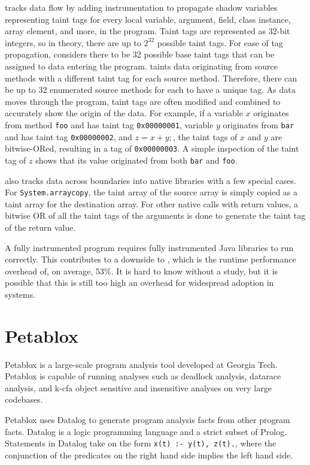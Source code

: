 \phosphor{} tracks data flow by adding instrumentation to propagate
shadow variables representing taint tags for every local variable,
argument, field, class instance, array element, and more, in the
program. Taint tags are represented as 32-bit integers, so in theory,
there are up to $2^{32}$ possible taint tags. For ease of tag
propagation, \phosphor{} considers there to be 32 possible base taint
tags that can be assigned to data entering the program. \phosphor{}
taints data originating from source methods with a different taint tag
for each source method. Therefore, there can be up to 32 enumerated
source methods for each to have a unique tag. As data moves through
the program, taint tags are often modified and combined to accurately
show the origin of the data. For example, if a variable $x$ originates
from method \texttt{foo} and has taint tag \texttt{0x00000001},
variable $y$ originates from \texttt{bar} and has taint tag
\texttt{0x00000002}, and $z = x + y;$, the taint tags of $x$ and $y$
are bitwise-ORed, resulting in a tag of \texttt{0x00000003}. A simple
inspection of the taint tag of $z$ shows that its value originated
from both \texttt{bar} and \texttt{foo}.

\phosphor{} also tracks data across boundaries into native libraries
with a few special cases. For \texttt{System.arraycopy}, the taint
array of the source array is simply copied as a taint array for the
destination array. For other native calls with return values, a
bitwise OR of all the taint tags of the arguments is done to generate
the taint tag of the return value.

A fully instrumented program requires fully instrumented Java
libraries to run correctly. This contributes to a downside to
\phosphor{}, which is the runtime performance overhead of, on average,
53\%. It is hard to know without a study, but it is possible that this
is still too high an overhead for widespread adoption in systems.

\section{Petablox}
Petablox \cite{petablox} is a large-scale program analysis tool
developed at Georgia Tech. Petablox is capable of running analyses
such as deadlock analysis, datarace analysis, and k-cfa object
sensitive and insensitive analyses on very large codebases.

Petablox uses Datalog \cite{datalog} to generate program analysis
facts from other program facts. Datalog is a logic programming
language and a strict subset of Prolog. Statements in Datalog take on
the form \texttt{x(t) :- y(t), z(t).}, where the conjunction of the
predicates on the right hand side implies the left hand side.

